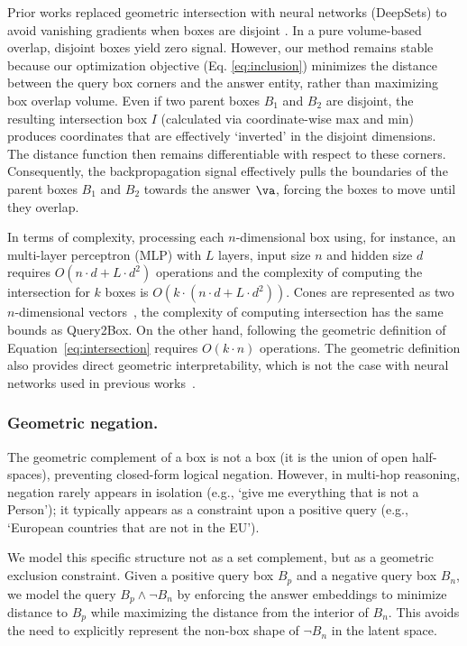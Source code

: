 \documentclass[runningheads]{llncs}
\renewcommand{\paragraph}[1]{\subsubsection{#1}}
\begin{document}
 Prior works replaced geometric intersection with neural networks
  (DeepSets) to avoid vanishing gradients when boxes are disjoint
  \cite{Mei_2024,boxcd,improving_ident}. In a pure volume-based
  overlap, disjoint boxes yield zero signal. However, our method
  remains stable because our optimization objective
  (Eq. \ref{eq:inclusion}) minimizes the distance between the query
  box corners and the answer entity, rather than maximizing box
  overlap volume.  Even if two parent boxes $B_1$ and $B_2$ are
  disjoint, the resulting intersection box $I$ (calculated via
  coordinate-wise max and min) produces coordinates that are
  effectively `inverted' in the disjoint dimensions. The distance
  function then remains differentiable with respect to these
  corners. Consequently, the backpropagation signal effectively pulls
  the boundaries of the parent boxes $B_1$ and $B_2$ towards the
  answer $\va$, forcing the boxes to move until they overlap.
  
  In terms of complexity, processing each $n$-dimensional box using,
  for instance, an multi-layer perceptron (MLP) with $L$ layers, input
  size $n$ and hidden size $d$ requires $O(n\cdot d + L \cdot d^2)$
  operations and the complexity of computing the intersection for $k$
  boxes is $O(k\cdot (n \cdot d + L\cdot d^2))$. Cones are represented
  as two $n$-dimensional vectors~\cite{cone,acone}, the complexity of
  computing intersection has the same bounds as Query2Box. On the
  other hand, following the geometric definition of
  Equation~\ref{eq:intersection} requires $O(k\cdot n)$ operations.
  The geometric definition also provides direct geometric
  interpretability, which is not the case with neural networks used in
  previous works~\cite{gqe,query2box,betae,cone,acone}.

\paragraph{Geometric negation.}
The geometric complement of a box is not a box (it is the union of
open half-spaces), preventing closed-form logical negation. However,
in multi-hop reasoning, negation rarely appears in isolation (e.g.,
`give me everything that is not a Person'); it typically appears as a
constraint upon a positive query (e.g., `European countries that are
not in the EU').

  We model this specific structure not as a set complement, but as a
  geometric exclusion constraint. Given a positive query box $B_p$ and
  a negative query box $B_n$, we model the query $B_p \land \neg B_n$
  by enforcing the answer embeddings to minimize distance to $B_p$ while
  maximizing the distance from the interior of $B_n$. This avoids the
  need to explicitly represent the non-box shape of $\neg B_n$ in the
  latent space.
\end{document}
